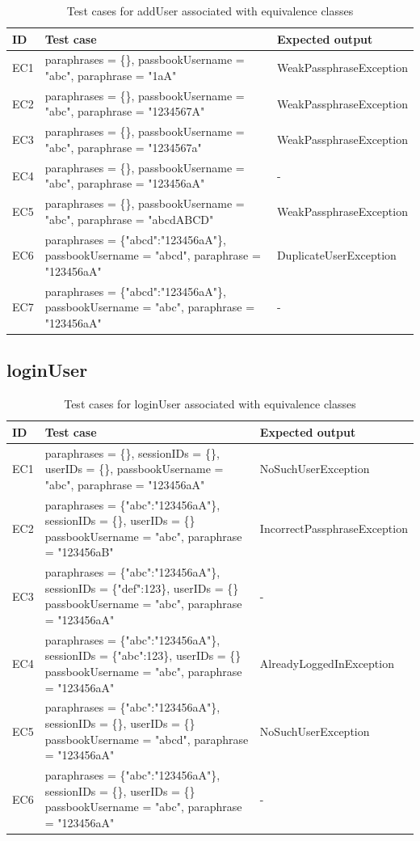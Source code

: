 \documentclass{article}
\begin{document}
\begin{longtable}{|p{2cm}|p{7cm}|p{5cm}|}
\caption{Test cases for addUser associated with equivalence classes}\\
\hline 
ID&Test case&Expected output\\
\hline  
EC1&paraphrases = \{\}, passbookUsername = "abc", paraphrase = "1aA"&WeakPassphraseException\\
\hline
EC2&paraphrases = \{\}, passbookUsername = "abc", paraphrase = "1234567A"&WeakPassphraseException\\
\hline
EC3&paraphrases = \{\}, passbookUsername = "abc", paraphrase = "1234567a"&WeakPassphraseException\\
\hline
EC4&paraphrases = \{\}, passbookUsername = "abc", paraphrase = "123456aA"&-\\
\hline
EC5&paraphrases = \{\}, passbookUsername = "abc", paraphrase = "abcdABCD"&WeakPassphraseException\\
\hline
EC6&paraphrases = \{"abcd":"123456aA"\}, passbookUsername = "abcd", paraphrase = "123456aA"&DuplicateUserException\\
\hline
EC7&paraphrases = \{"abcd":"123456aA"\}, passbookUsername = "abc", paraphrase = "123456aA"&-\\
\hline
\end{longtable}

\subsection{loginUser}

\begin{longtable}{|p{2cm}|p{7cm}|p{5cm}|}
\caption{Test cases for loginUser associated with equivalence classes}\\
\hline 
ID&Test case&Expected output\\
\hline  
EC1&paraphrases = \{\}, sessionIDs = \{\}, userIDs = \{\}, passbookUsername = "abc", paraphrase = "123456aA"&NoSuchUserException\\
\hline
EC2&paraphrases = \{"abc":"123456aA"\}, sessionIDs = \{\}, userIDs = \{\} passbookUsername = "abc", paraphrase = "123456aB"&IncorrectPassphraseException\\
\hline
EC3&paraphrases = \{"abc":"123456aA"\}, sessionIDs = \{"def":123\}, userIDs = \{\} passbookUsername = "abc", paraphrase = "123456aA"&-\\
\hline
EC4&paraphrases = \{"abc":"123456aA"\}, sessionIDs = \{"abc":123\}, userIDs = \{\} passbookUsername = "abc", paraphrase = "123456aA"&AlreadyLoggedInException\\
\hline
EC5&paraphrases = \{"abc":"123456aA"\}, sessionIDs = \{\}, userIDs = \{\} passbookUsername = "abcd", paraphrase = "123456aA"&NoSuchUserException\\
\hline
EC6&paraphrases = \{"abc":"123456aA"\}, sessionIDs = \{\}, userIDs = \{\} passbookUsername = "abc", paraphrase = "123456aA"&-\\
\hline
\end{longtable}
\end{document}
